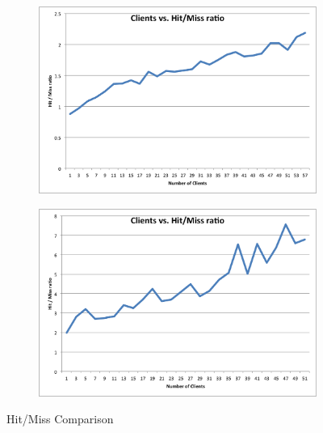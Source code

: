 \documentclass[conference]{IEEEtran}
\begin{document}
\begin{figure}[!h]
	\centering
	\begin{subfigure}[b]{0.49\columnwidth}
		\centering
		\includegraphics[width=\columnwidth]{figures/hit_miss.png}
	\end{subfigure}
	\begin{subfigure}[b]{0.49\columnwidth}
		\centering
		\includegraphics[width=\columnwidth]{figures/hit_miss_1.png}
	\end{subfigure}
	\caption{Hit/Miss Comparison}
\end{figure}
\end{document}
